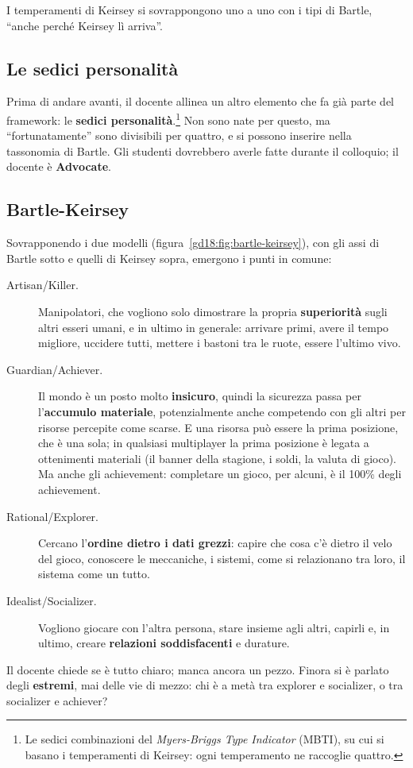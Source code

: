 I temperamenti di Keirsey si sovrappongono uno a uno con i tipi di Bartle, ``anche
perché Keirsey lì arriva''.

\subsection{Le sedici personalità}

Prima di andare avanti, il docente allinea un altro elemento che fa già parte del
framework: le \textbf{sedici personalità}.\footnote{Le sedici combinazioni del
\emph{Myers-Briggs Type Indicator} (MBTI), su cui si basano i temperamenti di
Keirsey: ogni temperamento ne raccoglie quattro.} Non sono nate per questo, ma
``fortunatamente'' sono divisibili per quattro, e si possono inserire nella
tassonomia di Bartle. Gli studenti dovrebbero averle fatte durante il colloquio; il
docente è \textbf{Advocate}.


\subsection{Bartle-Keirsey}

Sovrapponendo i due modelli (figura~\ref{gd18:fig:bartle-keirsey}), con gli assi di
Bartle sotto e quelli di Keirsey sopra, emergono i punti in comune:
\begin{description}
  \item[Artisan/Killer.] Manipolatori, che vogliono solo dimostrare la propria
        \textbf{superiorità} sugli altri esseri umani, e in ultimo in generale:
        arrivare primi, avere il tempo migliore, uccidere tutti, mettere i bastoni tra
        le ruote, essere l'ultimo vivo.
  \item[Guardian/Achiever.] Il mondo è un posto molto \textbf{insicuro}, quindi la
        sicurezza passa per l'\textbf{accumulo materiale}, potenzialmente anche
        competendo con gli altri per risorse percepite come scarse. E una risorsa può
        essere la prima posizione, che è una sola; in qualsiasi multiplayer la prima
        posizione è legata a ottenimenti materiali (il banner della stagione, i soldi,
        la valuta di gioco). Ma anche gli achievement: completare un gioco, per
        alcuni, è il 100\% degli achievement.
  \item[Rational/Explorer.] Cercano l'\textbf{ordine dietro i dati grezzi}: capire
        che cosa c'è dietro il velo del gioco, conoscere le meccaniche, i sistemi, come
        si relazionano tra loro, il sistema come un tutto.
  \item[Idealist/Socializer.] Vogliono giocare con l'altra persona, stare insieme
        agli altri, capirli e, in ultimo, creare \textbf{relazioni soddisfacenti} e
        durature.
\end{description}
Il docente chiede se è tutto chiaro; manca ancora un pezzo. Finora si è parlato
degli \textbf{estremi}, mai delle vie di mezzo: chi è a metà tra explorer e
socializer, o tra socializer e achiever?

